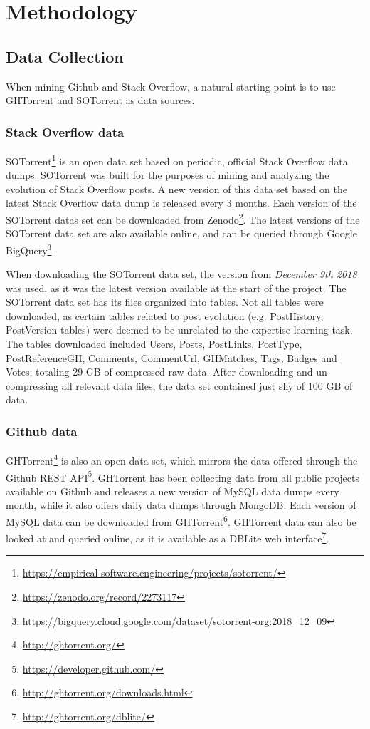 \chapter{Methodology}

\section{\label{data_collection}Data Collection}

    When mining Github and Stack Overflow, a natural starting point is to use GHTorrent \cite{gousios2013ghtorent} and SOTorrent \cite{baltes2018sotorrent} as data sources.
    \subsection{Stack Overflow data}
        SOTorrent\footnote{\label{SOTorrent}\url{https://empirical-software.engineering/projects/sotorrent/}} is an open data set based on periodic, official Stack Overflow data dumps. SOTorrent was built for the purposes of mining and analyzing the evolution of Stack Overflow posts. A new version of this data set based on the latest Stack Overflow data dump is released every 3 months. Each version of the SOTorrent datas set can be downloaded from Zenodo\footnote{\label{SOTorrent_Zenodo} \url{https://zenodo.org/record/2273117}}. The latest versions of the SOTorrent data set are also available online, and can be queried through Google BigQuery\footnote{\label{BigQuery} \url{https://bigquery.cloud.google.com/dataset/sotorrent-org:2018_12_09}}.
        
        When downloading the SOTorrent data set, the version from \textit{December 9th 2018} was used, as it was the latest version available at the start of the project. The SOTorrent data set has its files organized into tables. Not all tables were downloaded, as certain tables related to post evolution (e.g. PostHistory, PostVersion tables) were deemed to be unrelated to the expertise learning task. The tables downloaded included Users, Posts, PostLinks, PostType, PostReferenceGH, Comments, CommentUrl, GHMatches, Tags, Badges and Votes, totaling 29 GB of compressed raw data. After downloading and un-compressing all relevant data files, the data set contained just shy of 100 GB of data.
        
    \subsection{Github data}
        GHTorrent\footnote{\label{GHTOrrent}\url{http://ghtorrent.org/}} is also an open data set, which mirrors the data offered through the Github REST API\footnote{\url{https://developer.github.com/}}. GHTorrent has been collecting data from all public projects available on Github and releases a new version of MySQL data dumps every month, while it also offers daily data dumps through MongoDB. Each version of MySQL data can be downloaded from GHTorrent\footnote{\label{GH_dowload}\url{http://ghtorrent.org/downloads.html}}. GHTorrent data can also be looked at and queried online, as it is available as a DBLite web interface\footnote{\label{GH_query}\url{http://ghtorrent.org/dblite/}}. 
            

